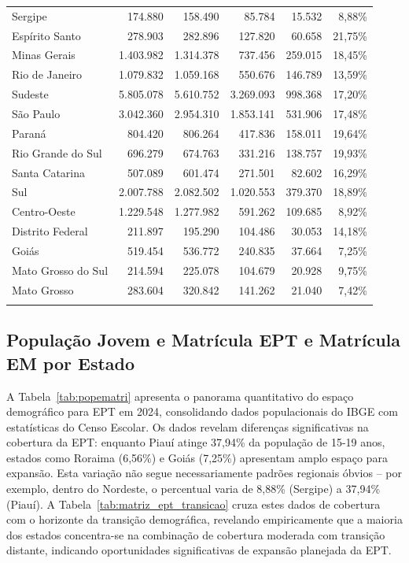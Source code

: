 \begin{table}[!htbp]
\begin{tabular}{@{\extracolsep{5pt}} lrrrrr}
		Sergipe &    174.880 &    158.490 &    85.784 &    15.532 &  8,88\% \\ 
		Espírito Santo &    278.903 &    282.896 &   127.820 &    60.658 & 21,75\% \\ 
		Minas Gerais &  1.403.982 &  1.314.378 &   737.456 &   259.015 & 18,45\% \\ 
		Rio de Janeiro &  1.079.832 &  1.059.168 &   550.676 &   146.789 & 13,59\% \\ 
		Sudeste &  5.805.078 &  5.610.752 & 3.269.093 &   998.368 & 17,20\% \\ 
		São Paulo &  3.042.360 &  2.954.310 & 1.853.141 &   531.906 & 17,48\% \\ 
		Paraná &    804.420 &    806.264 &   417.836 &   158.011 & 19,64\% \\ 
		Rio Grande do Sul &    696.279 &    674.763 &   331.216 &   138.757 & 19,93\% \\ 
		Santa Catarina &    507.089 &    601.474 &   271.501 &    82.602 & 16,29\% \\ 
		Sul &  2.007.788 &  2.082.502 & 1.020.553 &   379.370 & 18,89\% \\ 
		Centro-Oeste &  1.229.548 &  1.277.982 &   591.262 &   109.685 &  8,92\% \\ 
		Distrito Federal &    211.897 &    195.290 &   104.486 &    30.053 & 14,18\% \\ 
		Goiás &    519.454 &    536.772 &   240.835 &    37.664 &  7,25\% \\ 
		Mato Grosso do Sul &    214.594 &    225.078 &   104.679 &    20.928 &  9,75\% \\ 
		Mato Grosso &    283.604 &    320.842 &   141.262 &    21.040 &  7,42\% \\ 
		\hline \\[-1.8ex] 
	\end{tabular} 
\end{table}

\subsection{População Jovem e Matrícula EPT e Matrícula EM por Estado}

A Tabela~\ref{tab:popematri} apresenta o panorama quantitativo do espaço demográfico para EPT em 2024, consolidando dados populacionais do IBGE com estatísticas do Censo Escolar. Os dados revelam diferenças significativas na cobertura da EPT: enquanto Piauí atinge 37,94\% da população de 15-19 anos, estados como Roraima (6,56\%) e Goiás (7,25\%) apresentam amplo espaço para expansão. Esta variação não segue necessariamente padrões regionais óbvios -- por exemplo, dentro do Nordeste, o percentual varia de 8,88\% (Sergipe) a 37,94\% (Piauí). A Tabela~\ref{tab:matriz_ept_transicao} cruza estes dados de cobertura com o horizonte da transição demográfica, revelando empiricamente que a maioria dos estados concentra-se na combinação de cobertura moderada com transição distante, indicando oportunidades significativas de expansão planejada da EPT.

